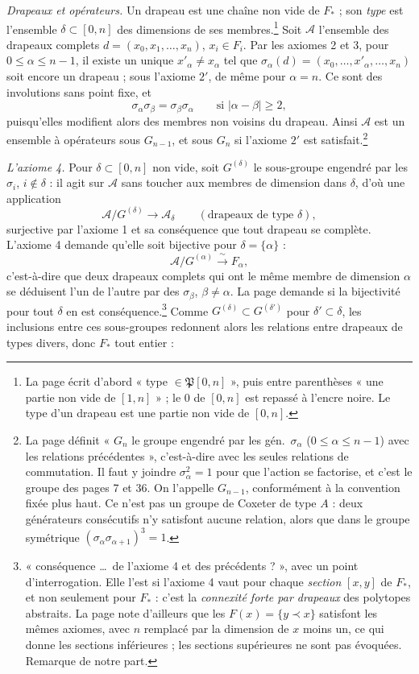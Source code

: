 \documentclass[11pt,a4paper]{article}
\begin{document}
\emph{Drapeaux et opérateurs.} Un drapeau est une chaîne non vide de $F_*$ ;
son \emph{type} est l'ensemble $\delta \subset [0, n]$ des dimensions de ses
membres.\footnote{La page écrit d'abord « type $\in \mathfrak{P}[0,n]$ »,
puis entre parenthèses « une partie non vide de $[1,n]$ » ; le $0$ de
$[0,n]$ est repassé à l'encre noire. Le type d'un drapeau est une partie non
vide de $[0, n]$.} Soit $\mathcal{A}$ l'ensemble des drapeaux complets $d =
(x_0, x_1, \ldots, x_n)$, $x_i \in F_i$. Par les axiomes 2 et 3, pour $0
\leqslant \alpha \leqslant n-1$, il existe un unique $x'_\alpha \neq
x_\alpha$ tel que $\sigma_\alpha(d) = (x_0, \ldots, x'_\alpha, \ldots, x_n)$
soit encore un drapeau ; sous l'axiome $2'$, de même pour $\alpha = n$. Ce
sont des involutions sans point fixe, et
\[
  \sigma_\alpha\sigma_\beta = \sigma_\beta\sigma_\alpha \qquad \text{si }
  |\alpha - \beta| \geqslant 2 ,
\]
puisqu'elles modifient alors des membres non voisins du drapeau. Ainsi
$\mathcal{A}$ est un ensemble à opérateurs sous $G_{n-1}$, et sous $G_n$ si
l'axiome $2'$ est satisfait.\footnote{La page définit « $G_n$ le groupe
engendré par les gén.\ $\sigma_\alpha$ ($0 \leqslant \alpha \leqslant n-1$)
avec les relations précédentes », c'est-à-dire avec les seules relations de
commutation. Il faut y joindre $\sigma_\alpha^2 = 1$ pour que l'action se
factorise, et c'est le groupe des pages 7 et 36. On l'appelle $G_{n-1}$,
conformément à la convention fixée plus haut. Ce n'est pas un groupe de
Coxeter de type $A$ : deux générateurs consécutifs n'y satisfont aucune
relation, alors que dans le groupe symétrique $(\sigma_\alpha
\sigma_{\alpha+1})^3 = 1$.}

\emph{L'axiome 4.} Pour $\delta \subset [0, n]$ non vide, soit
$G^{(\delta)}$ le sous-groupe engendré par les $\sigma_i$, $i \notin
\delta$ : il agit sur $\mathcal{A}$ sans toucher aux membres de dimension
dans $\delta$, d'où une application
\[
  \mathcal{A}/G^{(\delta)} \longrightarrow \mathcal{A}_\delta
  \qquad (\text{drapeaux de type } \delta),
\]
surjective par l'axiome 1 et sa conséquence que tout drapeau se complète.
L'axiome 4 demande qu'elle soit bijective pour $\delta = \{\alpha\}$ :
\[
  \mathcal{A}/G^{(\alpha)} \xrightarrow{\ \sim\ } F_\alpha ,
\]
c'est-à-dire que deux drapeaux complets qui ont le même membre de dimension
$\alpha$ se déduisent l'un de l'autre par des $\sigma_\beta$, $\beta \neq
\alpha$. La page demande si la bijectivité pour tout $\delta$ en est
conséquence.\footnote{« conséquence \ldots\ de l'axiome 4 et des
précédents ? », avec un point d'interrogation. Elle l'est si l'axiome 4 vaut
pour chaque \emph{section} $[x, y]$ de $F_*$, et non seulement pour $F_*$ :
c'est la \emph{connexité forte par drapeaux} des polytopes abstraits. La page
note d'ailleurs que les $F(x) = \{y \prec x\}$ satisfont les mêmes axiomes,
avec $n$ remplacé par la dimension de $x$ moins un, ce qui donne les sections
inférieures ; les sections supérieures ne sont pas évoquées. Remarque de
notre part.} Comme $G^{(\delta)} \subset G^{(\delta')}$ pour $\delta' \subset
\delta$, les inclusions entre ces sous-groupes redonnent alors les relations
entre drapeaux de types divers, donc $F_*$ tout entier :
\end{document}
